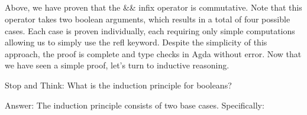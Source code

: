 \documentclass{lecturenotes}
\begin{document}
\begin{center}
    \begin{code}%
%
\>[8]\AgdaSpace{}%
\AgdaSymbol{:}\AgdaSpace{}%
\AgdaSpace{}%
\AgdaSymbol{(}\AgdaSpace{}%
\AgdaSpace{}%
\AgdaSymbol{:}\AgdaSpace{}%
\AgdaSymbol{)}\AgdaSpace{}%
\AgdaSymbol{->}\AgdaSpace{}%
\AgdaSpace{}%
\AgdaOperator{\AgdaFunction{\&\&}}\AgdaSpace{}%
\AgdaSpace{}%
\AgdaSpace{}%
\AgdaSpace{}%
\AgdaOperator{\AgdaFunction{\&\&}}\AgdaSpace{}%
\<%
\\
%
\>[8]\AgdaSpace{}%
\AgdaSpace{}%
\AgdaSpace{}%
\AgdaSymbol{=}\AgdaSpace{}%
\<%
\\
%
\>[8]\AgdaSpace{}%
\AgdaSpace{}%
\AgdaSpace{}%
\AgdaSymbol{=}\AgdaSpace{}%
\<%
\\
%
\>[8]\AgdaSpace{}%
\AgdaSpace{}%
\AgdaSpace{}%
\AgdaSymbol{=}\AgdaSpace{}%
\<%
\\
%
\>[8]\AgdaSpace{}%
\AgdaSpace{}%
\AgdaSpace{}%
\AgdaSymbol{=}\AgdaSpace{}%
\<%
\end{code}
\end{center}

Above, we have proven that the \textsf{\&\&} infix operator is commutative. 
Note that this operator takes two boolean arguments, which results in a total of four possible cases.
Each case is proven individually, each requiring only simple computations allowing us to simply use the \textsf{refl} keyword. 
Despite the simplicity of this approach, the proof is complete and type checks in Agda without error. 
Now that we have seen a simple proof, let's turn to inductive reasoning.

\vspace{0.2in}

\noindent Stop and Think: What is the induction principle for booleans?

\noindent Answer: The induction principle consists of two base cases. Specifically: 
\end{document}
